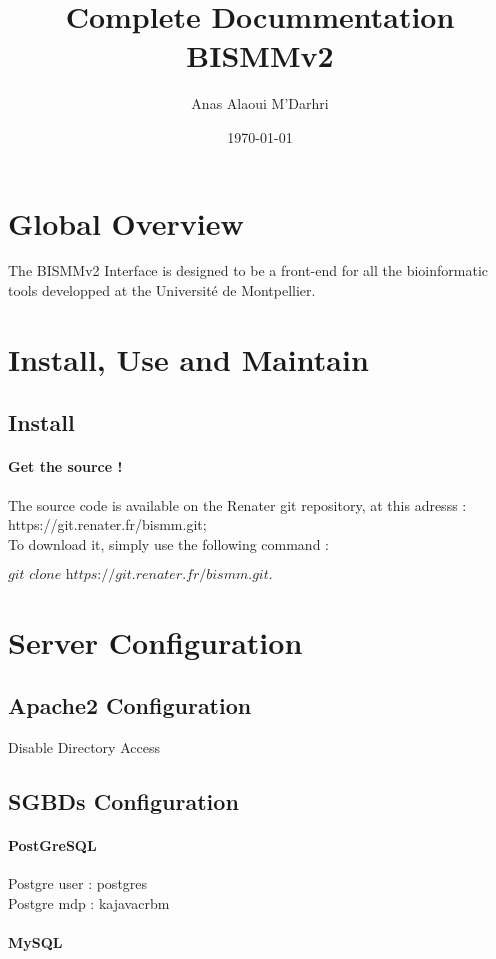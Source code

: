 \documentclass[12pt]{article}
\title{Complete Docummentation \\ BISMMv2}
\author{Anas Alaoui M'Darhri
}
\date{\today}
\begin{document}
\maketitle
\newpage

\section*{Global Overview}
The BISMMv2 Interface is designed to be a front-end for all the bioinformatic tools developped at the Université de Montpellier.
\section{Install, Use and Maintain}
\subsection{Install}

 \paragraph{Get the source !} 

The source code is available on the Renater git repository, at this adresss : https://git.renater.fr/bismm.git; \\
To download it, simply use the following command : \\
 \begin{center}$\textit{git clone  https://git.renater.fr/bismm.git}.$\end{center}
\section{Server Configuration}\label{previous work}
\subsection{Apache2 Configuration}\label{previous work}
Disable Directory Access
\subsection{SGBDs Configuration}\label{previous work}
\paragraph{PostGreSQL}

Postgre user : postgres\\
Postgre mdp : kajavacrbm
\paragraph{MySQL}
\end{document}
